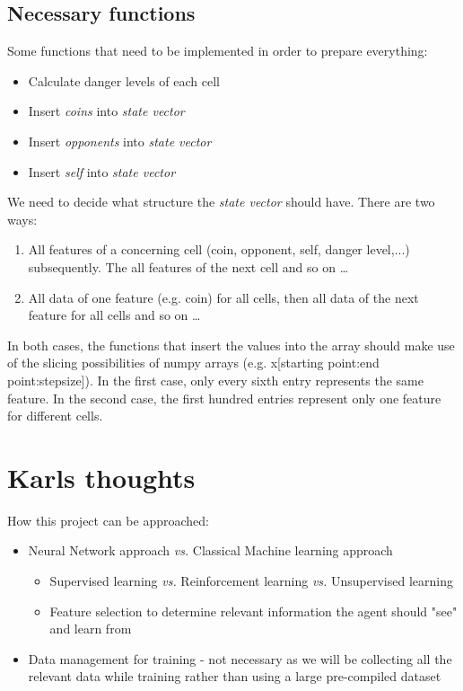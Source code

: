 \documentclass[12pt]{report}
\newcommand{\code}[1]{{\fontfamily{pcr}\selectfont #1}}
\begin{document}
\subsection{Necessary functions}
Some functions that need to be implemented in order to prepare everything:
\begin{itemize}
	\item Calculate danger levels of each cell
	\item Insert \textit{coins} into \textit{state vector}
	\item Insert \textit{opponents} into \textit{state vector}
	\item Insert \textit{self} into \textit{state vector}
\end{itemize}
We need to decide what structure the \textit{state vector} should have. There are two ways:
\begin{enumerate}
	\item All features of a concerning cell (coin, opponent, self, danger level,...) subsequently. The all features of the next cell and so on \dots
	\item All data of one feature (e.g. coin) for all cells, then all data of the next feature for all cells and so on \dots
\end{enumerate}
In both cases, the functions that insert the values into the array should make use of the slicing possibilities of numpy arrays (e.g. \code{x[starting point:end point:stepsize]}). In the first case, only every sixth entry represents the same feature. In the second case, the first hundred entries represent only one feature for different cells.

\section{Karls thoughts}

How this project can be approached:
	\begin{itemize}
		\item Neural Network approach \textit{vs.} Classical Machine learning approach
		\begin{itemize}
			\item Supervised learning \textit{vs.} Reinforcement learning \textit{vs.} Unsupervised learning
			\item Feature selection to determine relevant information the agent should "see" and learn from
		\end{itemize}
		\item Data management for training - not necessary as we will be collecting all the relevant data while training rather than using a large pre-compiled dataset
	\end{itemize}
\end{document}
